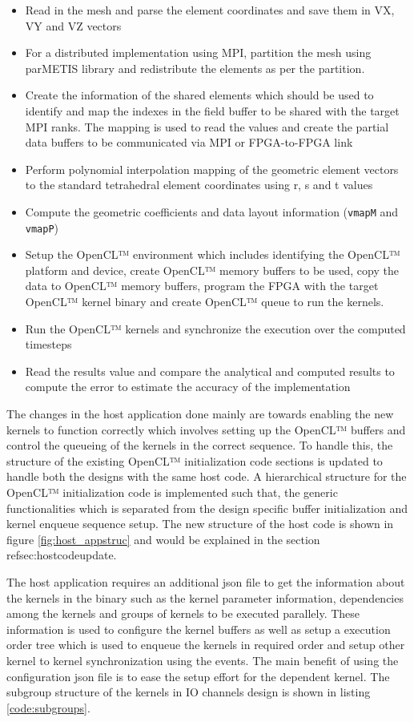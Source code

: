 \begin{itemize}
    \item Read in the mesh and parse the element coordinates and save them in VX, VY and VZ vectors
    \item For a distributed implementation using MPI, partition the mesh using parMETIS library
    and redistribute the elements as per the partition.
    \item Create the information of the shared elements which should be used to identify and map the
    indexes in the field buffer to be shared with the target MPI ranks. The mapping is used to read the
    values and create the partial data buffers to be communicated via MPI or FPGA-to-FPGA link
    \item Perform polynomial interpolation mapping of the geometric element vectors to the standard tetrahedral
    element coordinates using r, s and t values
    \item Compute the geometric coefficients and data layout information (\texttt{vmapM} and \texttt{vmapP})
    \item Setup the OpenCL™ environment which includes identifying the OpenCL™ platform and device,
    create OpenCL™ memory buffers to be used, copy the data to OpenCL™ memory buffers, program the FPGA with the
    target OpenCL™ kernel binary and create OpenCL™ queue to run the kernels.
    \item Run the OpenCL™ kernels and synchronize the execution over the computed timesteps
    \item Read the results value and compare the analytical and computed results to compute the error
    to estimate the accuracy of the implementation
\end{itemize}

The changes in the host application done mainly are towards enabling the new kernels to function correctly
which involves setting up the OpenCL™ buffers and control the queueing of the kernels in the correct sequence.
To handle this, the structure of the existing OpenCL™ initialization code sections is updated to handle
both the designs with the same host code. A hierarchical structure for the OpenCL™ initialization code
is implemented such that, the generic functionalities which is separated from the design specific buffer
initialization and kernel enqueue sequence setup. The new structure of the host code is shown
in figure \ref{fig:host_appstruc} and would be explained in the section ref{sec:hostcodeupdate}.

The host application requires an additional json file to get the information about the kernels in the binary such as
the kernel parameter information, dependencies among the kernels and groups of kernels to be executed parallely.
These information is used to configure the kernel buffers as well as setup a execution order tree which is used
to enqueue the kernels in required order and setup other kernel to kernel synchronization using the events.
The main benefit of using the configuration json file is to ease the setup effort for the dependent kernel.
The subgroup structure of the kernels in IO channels design is shown in listing \ref{code:subgroups}.

